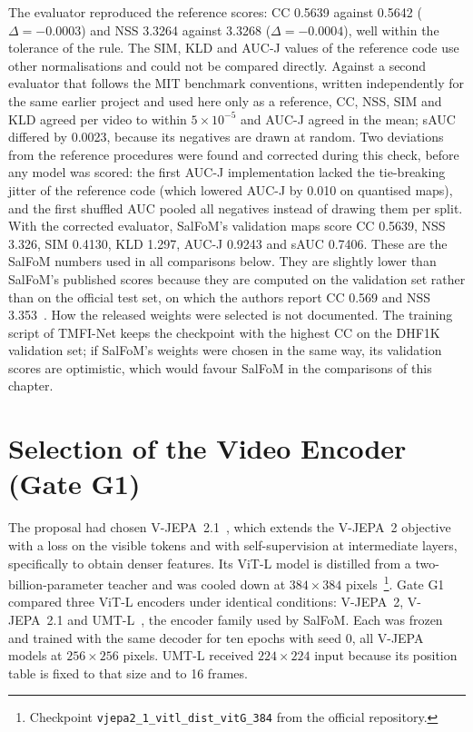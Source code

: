 The evaluator reproduced the reference scores: \acrshort{CC} 0.5639 against 0.5642
($\Delta=-0.0003$) and \acrshort{NSS} 3.3264 against 3.3268 ($\Delta=-0.0004$), well within
the tolerance of the rule. The \acrshort{SIM}, \acrshort{KLD} and \acrshort{AUC-J} values of the reference code
use other normalisations and could not be compared directly. Against a second
evaluator that follows the MIT benchmark conventions, written independently for
the same earlier project and used here only as a reference, \acrshort{CC}, \acrshort{NSS}, \acrshort{SIM} and
\acrshort{KLD} agreed per video to within $5\times10^{-5}$ and \acrshort{AUC-J} agreed in the mean; \acrshort{sAUC}
differed by 0.0023, because its negatives are drawn at random. Two deviations
from the reference procedures were found and
corrected during this check, before any model was scored: the first \acrshort{AUC-J}
implementation lacked the tie-breaking jitter of the reference code (which
lowered \acrshort{AUC-J} by 0.010 on quantised maps), and the first shuffled \acrshort{AUC} pooled all
negatives instead of drawing them per split. With the corrected evaluator,
SalFoM's validation maps score \acrshort{CC} 0.5639, \acrshort{NSS} 3.326, \acrshort{SIM} 0.4130, \acrshort{KLD} 1.297,
\acrshort{AUC-J} 0.9243 and \acrshort{sAUC} 0.7406. These are the SalFoM numbers used in all
comparisons below. They are slightly lower than SalFoM's published scores
because they are computed on the validation set rather than on the official
test set, on which the authors report \acrshort{CC} 0.569 and \acrshort{NSS}
3.353~\cite{moradi2024salfom}. How the released weights were selected is not
documented. The training script of TMFI-Net keeps the checkpoint with the
highest \acrshort{CC} on the DHF1K validation set; if SalFoM's weights were
chosen in the same way, its validation scores are optimistic, which would
favour SalFoM in the comparisons of this chapter.

\section{Selection of the Video Encoder (Gate G1)}\label{sec:g1}

The proposal had chosen \acrshort{V-JEPA}~2.1~\cite{murlabadia2026vjepa21}, which extends
the \acrshort{V-JEPA}~2 objective with a loss on the visible tokens and with
self-supervision at intermediate layers, specifically to obtain denser
features. Its \acrshort{ViT}-L model is distilled from a two-billion-parameter teacher and
was cooled down at $384\times384$ pixels~\cite{murlabadia2026vjepa21}\footnote{Checkpoint
\texttt{vjepa2\_1\_vitl\_dist\_vitG\_384} from the official repository.}.
Gate G1 compared three \acrshort{ViT}-L encoders under identical conditions: \acrshort{V-JEPA}~2,
\acrshort{V-JEPA}~2.1 and \acrshort{UMT}-L~\cite{li2023unmasked}, the encoder family used by SalFoM.
Each was frozen and trained with the same decoder for ten epochs with seed 0,
all \acrshort{V-JEPA} models at $256\times256$ pixels. \acrshort{UMT}-L received $224\times224$ input
because its position table is fixed to that size and to 16 frames.

